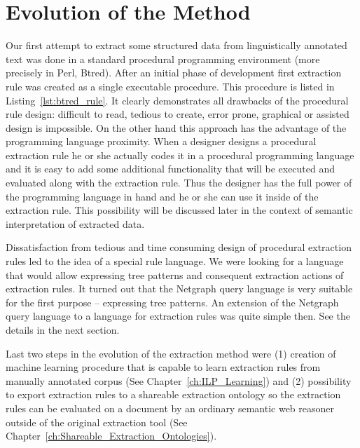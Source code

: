 \section{Evolution of the Method}

Our first attempt to extract some structured data from linguistically annotated text was done in a standard procedural programming environment (more precisely in Perl, Btred). After an initial phase of development first extraction rule was created as a single executable procedure. This procedure is listed in Listing~\ref{lst:btred_rule}. It clearly demonstrates all drawbacks of the procedural rule design: difficult to read, tedious to create, error prone, graphical or assisted design is impossible. On the other hand this approach has the advantage of the programming language proximity. When a designer designs a procedural extraction rule he or she actually codes it in a procedural programming language and it is easy to add some additional functionality that will be executed and evaluated along with the extraction rule. Thus the designer has the full power of the programming language in hand and he or she can use it inside of the extraction rule. This possibility will be discussed later in the context of semantic interpretation of extracted data.

Dissatisfaction from tedious and time consuming design of procedural extraction rules led to the idea of a special rule language. We were looking for a language that would allow expressing tree patterns and consequent extraction actions of extraction rules. It turned out that the Netgraph query language is very suitable for the first purpose -- expressing tree patterns. An extension of the Netgraph query language to a language for extraction rules was quite simple then. See the details in the next section.

Last two steps in the evolution of the extraction method were (1) creation of machine learning procedure that is capable to learn extraction rules from manually annotated corpus (See Chapter~\ref{ch:ILP_Learning}) and (2) possibility to export extraction rules to a shareable extraction ontology so the extraction rules can be evaluated on a document by an ordinary semantic web reasoner outside of the original extraction tool (See Chapter~\ref{ch:Shareable_Extraction_Ontologies}).


